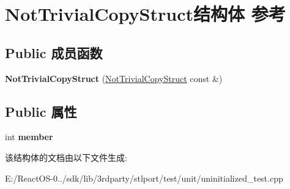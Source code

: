 \hypertarget{struct_not_trivial_copy_struct}{}\section{Not\+Trivial\+Copy\+Struct结构体 参考}
\label{struct_not_trivial_copy_struct}
\subsection*{Public 成员函数}
\begin{DoxyCompactItemize}
\item 
\mbox{\label{struct_not_trivial_copy_struct_a84d08b401867ffca0f44b7c0c325a416}} 
{\bfseries Not\+Trivial\+Copy\+Struct} (\hyperlink{struct_not_trivial_copy_struct}{Not\+Trivial\+Copy\+Struct} const \&)
\end{DoxyCompactItemize}
\subsection*{Public 属性}
\begin{DoxyCompactItemize}
\item 
\mbox{\label{struct_not_trivial_copy_struct_a1c9388486be9516b05d0e8b666633612}} 
int {\bfseries member}
\end{DoxyCompactItemize}


该结构体的文档由以下文件生成\+:\begin{DoxyCompactItemize}
\item 
E\+:/\+React\+O\+S-\/0../sdk/lib/3rdparty/stlport/test/unit/uninitialized\+\_\+test.\+cpp\end{DoxyCompactItemize}
